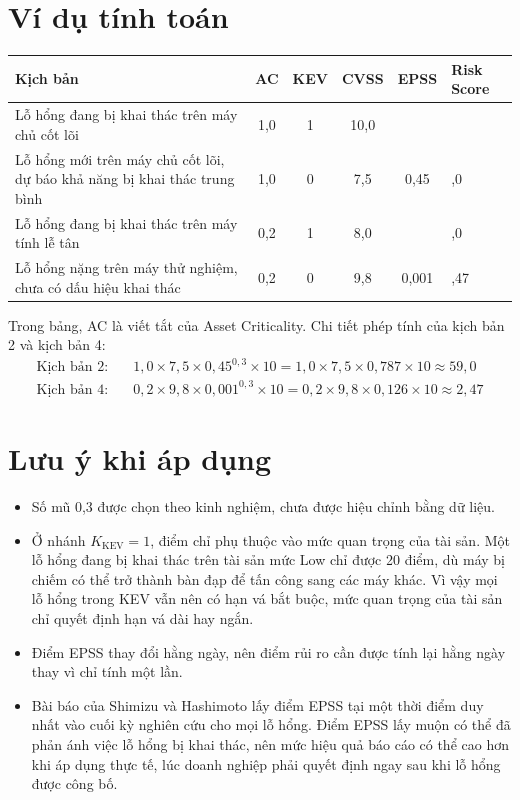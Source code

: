 \documentclass[12pt,a4paper]{article}
\begin{document}
\section{Ví dụ tính toán}

\begin{center}
\begin{tabular}{>{\raggedright}p{4.6cm} c c c c >{\raggedright\arraybackslash}p{2.2cm}}
\toprule
\textbf{Kịch bản} & \textbf{AC} & \textbf{KEV} & \textbf{CVSS} & \textbf{EPSS} & \textbf{Risk Score} \\
\midrule
Lỗ hổng đang bị khai thác trên máy chủ cốt lõi & 1,0 & 1 & 10,0 & & 100 \\
Lỗ hổng mới trên máy chủ cốt lõi, dự báo khả năng bị khai thác trung bình & 1,0 & 0 & 7,5 & 0,45 & 59,0 \\
Lỗ hổng đang bị khai thác trên máy tính lễ tân & 0,2 & 1 & 8,0 & & 20,0 \\
Lỗ hổng nặng trên máy thử nghiệm, chưa có dấu hiệu khai thác & 0,2 & 0 & 9,8 & 0,001 & 2,47 \\
\bottomrule
\end{tabular}
\end{center}

Trong bảng, AC là viết tắt của Asset Criticality. Chi tiết phép tính của kịch bản 2 và kịch bản 4:
\begin{align*}
\text{Kịch bản 2:}\quad & 1{,}0 \times 7{,}5 \times 0{,}45^{0{,}3} \times 10 = 1{,}0 \times 7{,}5 \times 0{,}787 \times 10 \approx 59{,}0 \\
\text{Kịch bản 4:}\quad & 0{,}2 \times 9{,}8 \times 0{,}001^{0{,}3} \times 10 = 0{,}2 \times 9{,}8 \times 0{,}126 \times 10 \approx 2{,}47
\end{align*}

\section{Lưu ý khi áp dụng}

\begin{itemize}[leftmargin=1.4em]
  \item Số mũ 0,3 được chọn theo kinh nghiệm, chưa được hiệu chỉnh bằng dữ liệu.
  \item Ở nhánh $K_{\text{KEV}} = 1$, điểm chỉ phụ thuộc vào mức quan trọng của tài sản. Một lỗ hổng
        đang bị khai thác trên tài sản mức Low chỉ được 20 điểm, dù máy bị chiếm có thể trở thành
        bàn đạp để tấn công sang các máy khác. Vì vậy mọi lỗ hổng trong KEV vẫn nên có hạn vá bắt
        buộc, mức quan trọng của tài sản chỉ quyết định hạn vá dài hay ngắn.
  \item Điểm EPSS thay đổi hằng ngày, nên điểm rủi ro cần được tính lại hằng ngày thay vì chỉ tính một lần.
  \item Bài báo của Shimizu và Hashimoto lấy điểm EPSS tại một thời điểm duy nhất vào cuối kỳ nghiên cứu
        cho mọi lỗ hổng. Điểm EPSS lấy muộn có thể đã phản ánh việc lỗ hổng bị khai thác, nên mức hiệu quả
        báo cáo có thể cao hơn khi áp dụng thực tế, lúc doanh nghiệp phải quyết định ngay sau khi lỗ hổng
        được công bố.
\end{itemize}
\end{document}
